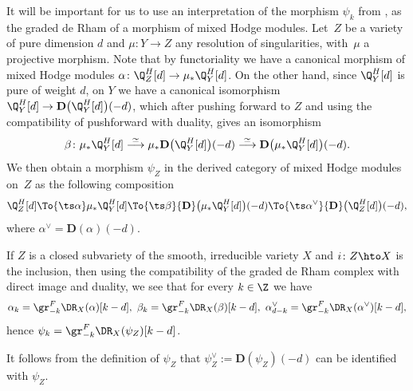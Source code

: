 It will be important for us to use an interpretation of the morphism $\psi_k$ from \cite[App.]{FL2}, as the graded de Rham of a
morphism of mixed Hodge modules. Let~$Z$ be a variety of pure dimension $d$ and $\mu\colon Y\to Z$ any resolution of singularities,
with~$\mu$ a projective morphism.
Note that by functoriality we have a canonical morphism of mixed Hodge modules $\alpha\colon \Q_Z^H[d]\to\mu_*\Q^H_Y[d]$. On the other hand,
since $\Q_Y^H[d]$ is pure of weight $d$,
on $Y$ we have a canonical
isomorphism $\Q_Y^H[d]\to {\mathbf D}\big(\Q_Y^H[d]\big)(-d)$, which after pushing forward to $Z$ and using the compatibility of pushforward with duality,
gives an isomorphism
\[\beta\colon \mu_*\Q_Y^H[d]\overset{\simeq}\longrightarrow \mu_*{\mathbf D}\big(\Q_Y^H[d]\big)(-d)\overset{\simeq}\longrightarrow
{\mathbf D}\big(\mu_*\Q_Y^H[d]\big)(-d).\]
We then obtain a morphism $\psi_Z$ in the derived category of mixed Hodge modules on~$Z$ as the following composition
\begin{equation}\label{eq_psi}
\Q_Z^H[d]\To{\ts\alpha} \mu_*\Q_Y^H[d]\To{\ts\beta} {\mathbf D}\big(\mu_*\Q_Y^H[d]\big)(-d)
\To{\ts\alpha^{\vee}}{\mathbf D}\big(\Q_Z^H[d]\big)(-d),
\end{equation}
where $\alpha^{\vee}={\mathbf D}(\alpha)(-d)$.

If $Z$ is a closed subvariety of the smooth, irreducible variety $X$ and $i\colon Z\hto X$ is the inclusion, then using the compatibility of
the graded de Rham complex with direct image and duality, we see that for every $k\in\Z$ we have
\[\alpha_k=\gr^F_{-k}\DR_X(\alpha)[k-d], \,\,\beta_k=\gr^F_{-k}\DR_X(\beta)[k-d],\,\,\alpha_{d-k}^{\vee}=
\gr^F_{-k}\DR_X(\alpha^{\vee})[k-d],\]
hence $\psi_k=\gr^F_{-k}\DR_X(\psi_Z)[k-d]$.

\begin{rmk}\label{dual_psi}
It follows from the definition of $\psi_Z$ that $\psi_Z^{\vee}:={\mathbf D}(\psi_Z)(-d)$ can be identified with $\psi_Z$.
\end{rmk}

